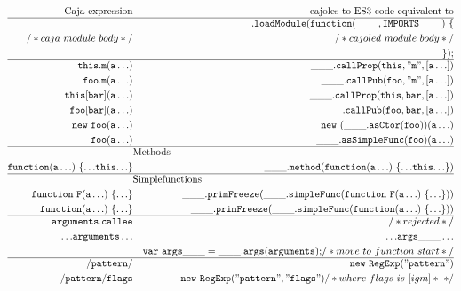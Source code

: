 \documentclass[letterpaper,twocolumn,10pt]{article}
\newcommand{\code}[1]{{\tt {#1}}}              %
\begin{document}
\begin{figure}
\begin{eqnarray}
  \mathrm{Caja\ expression} & \nonumber                & \mathrm{cajoles\ to\ ES3\ code\ equivalent\ to} \\ 
  \hline
                            & \label{module}           & \code{\_\_\_.loadModule(function(\_\_\_, IMPORTS\_\_\_)\ \{} \\
  /*caja\ module\ body*/    & \nonumber                & \code{\ \ } /*cajoled\ module\ body*/ \\
                            & \nonumber                & \code{\});} \\
  \hline
  \code{this.m(a\ldots)}   & \label{call:internal}     & \code{\_\_\_.callProp(this,"m",[a\ldots])} \\
  \code{foo.m(a\ldots)}    & \label{call:public}       & \code{\_\_\_.callPub(foo,"m",[a\ldots])} \\
  \code{this[bar](a\ldots)} & \label{call:index-internal} & \code{\_\_\_.callProp(this,bar,[a\ldots])} \\
  \code{foo[bar](a\ldots)} & \label{call:index-public} & \code{\_\_\_.callPub(foo,bar,[a\ldots])} \\
  \code{new\ foo(a\ldots)} & \label{new:ctor}          & \code{new\ (\_\_\_.asCtor(foo))(a\ldots)} \\
  \code{foo(a\ldots)}      & \label{call:func}         & \code{\_\_\_.asSimpleFunc(foo)(a\ldots)} \\
  \hline
   \nonumber & \lefteqn{\mathrm{Methods}} & \\
  \code{function(a\ldots)\ \{{\ldots}this{\ldots}\}}         
             & \label{member:method}  & \code{\_\_\_.method(function(a\ldots)\ \{{\ldots}this{\ldots}\})} \\
  \hline
   \nonumber & \lefteqn{\mathrm{Simple functions}} & \\
  \code{function\ F(a\ldots)\ \{{\ldots}\}}      
             & \label{func:named-expr}
                                 & \code{\_\_\_.primFreeze(\_\_\_.simpleFunc(function\ F(a\ldots)\ \{{\ldots}\}))} \\
  \code{function(a\ldots)\ \{{\ldots}\}}         
             & \label{func:anon} & \code{\_\_\_.primFreeze(\_\_\_.simpleFunc(function(a\ldots)\ \{{\ldots}\}))} \\ 
  \hline
  \code{arguments.callee} 
             & \label{read:bad-callee} & /*rejected*/ \\
  \code{{\ldots}arguments\ldots} 
             & \label{read:args}   & \code{{\ldots}args\_\_\_\ldots} \\
             & \nonumber           & \code{var\ args\_\_\_ = \_\_\_.args(arguments);} /*move\ to\ function\ start*/\\ 
  \hline
  \code{/pattern/}      & \label{pattern:unary}                 & \code{new\ RegExp("pattern")} \\
  \code{/pattern/flags} & \label{pattern:binary}
                                   & \code{new\ RegExp("pattern", "flags")} /*where\ flags\ is\ [igm]*\ */
\end{eqnarray}


\end{figure}
\end{document}

